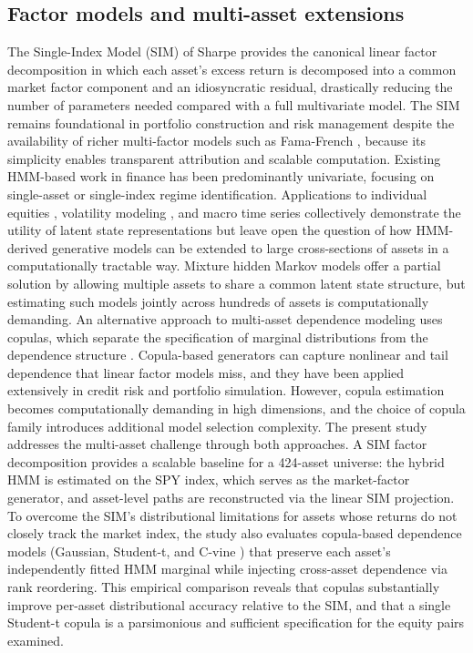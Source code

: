 \subsection{Factor models and multi-asset extensions}
The Single-Index Model (SIM) of Sharpe \cite{sharpe_simplified_1963} provides the canonical linear factor decomposition in which each asset's excess return is decomposed into a common market factor component and an idiosyncratic residual, drastically reducing the number of parameters needed compared with a full multivariate model. The SIM remains foundational in portfolio construction and risk management despite the availability of richer multi-factor models such as Fama-French \cite{fama_french_1993}, because its simplicity enables transparent attribution and scalable computation. Existing HMM-based work in finance has been predominantly univariate, focusing on single-asset or single-index regime identification. Applications to individual equities \cite{nguyen_hidden_2018}, volatility modeling \cite{rossi_volatility_2006}, and macro time series \cite{hamilton_1989, kim_nelson_1999} collectively demonstrate the utility of latent state representations but leave open the question of how HMM-derived generative models can be extended to large cross-sections of assets in a computationally tractable way. Mixture hidden Markov models \cite{dias_mixture_2010} offer a partial solution by allowing multiple assets to share a common latent state structure, but estimating such models jointly across hundreds of assets is computationally demanding. An alternative approach to multi-asset dependence modeling uses copulas, which separate the specification of marginal distributions from the dependence structure \cite{embrechts_copulas_2002, cherubini_copula_2004}. Copula-based generators can capture nonlinear and tail dependence that linear factor models miss, and they have been applied extensively in credit risk and portfolio simulation. However, copula estimation becomes computationally demanding in high dimensions, and the choice of copula family introduces additional model selection complexity. The present study addresses the multi-asset challenge through both approaches. A SIM factor decomposition provides a scalable baseline for a 424-asset universe: the hybrid HMM is estimated on the SPY index, which serves as the market-factor generator, and asset-level paths are reconstructed via the linear SIM projection. To overcome the SIM's distributional limitations for assets whose returns do not closely track the market index, the study also evaluates copula-based dependence models (Gaussian, Student-t, and C-vine \cite{aas_pair_2009}) that preserve each asset's independently fitted HMM marginal while injecting cross-asset dependence via rank reordering. This empirical comparison reveals that copulas substantially improve per-asset distributional accuracy relative to the SIM, and that a single Student-t copula is a parsimonious and sufficient specification for the equity pairs examined.
